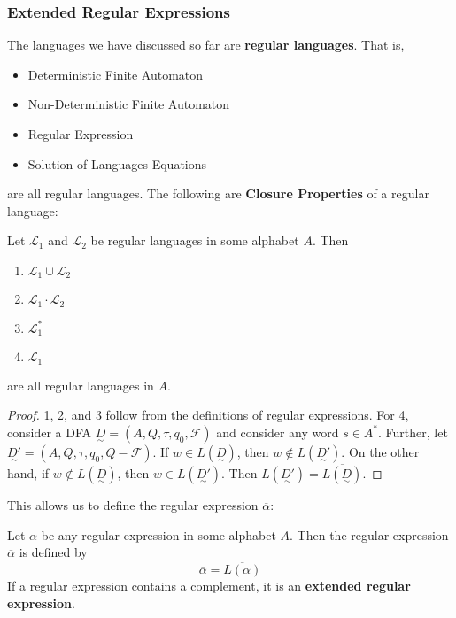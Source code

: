 \subsubsection{Extended Regular Expressions}\label{subsubsec:extended-regular-expressions"}
The languages we have discussed so far are \textbf{regular languages}. That is, 

\begin{itemize}
      \item Deterministic Finite Automaton
      \item Non-Deterministic Finite Automaton
      \item Regular Expression
      \item Solution of Languages Equations
\end{itemize}

are all regular languages. The following are \textbf{Closure Properties} of a regular language:

\begin{theorem}
      Let $\mathcal{L_1}$ and $\mathcal{L_2}$ be regular languages in some alphabet $A$. Then
      \begin{enumerate}[1)]
            \item $\mathcal{L}_1\cup\mathcal{L}_2$
            \item $\mathcal{L}_1\cdot \mathcal{L}_2$
            \item $\mathcal{L}_1^*$
            \item $\overline{\mathcal{L}_1}$
      \end{enumerate}

      are all regular languages in $A$.
\end{theorem}

\begin{proof}
      1, 2, and 3 follow from the definitions of regular expressions. For 4, consider a DFA $\underset{\sim}{D}=(A, Q, \tau, q_0, \mathcal{F})$ and consider any word $s\in A^*$. Further, let $\underset{\sim}{D'}=(A, Q, \tau, q_0, Q-\mathcal{F})$. If $w\in L(\underset{\sim}{D})$, then $w\not\in L(\underset{\sim}{D'})$. On the other hand, if $w\not\in L(\underset{\sim}{D})$, then $w\in L(\underset{\sim}{D'})$. Then $L(\underset{\sim}{D'})=\overline{L(\underset{\sim}{D})}$.
\end{proof}

This allows us to define the regular expression $\overline{\alpha}$:

\begin{definition}
      Let $\alpha$ be any regular expression in some alphabet $A$. Then the regular expression $\overline{\alpha}$ is defined by \[\overline{\alpha}=\overline{L(\alpha)}\] If a regular expression contains a complement, it is an \textbf{extended regular expression}.
\end{definition}

